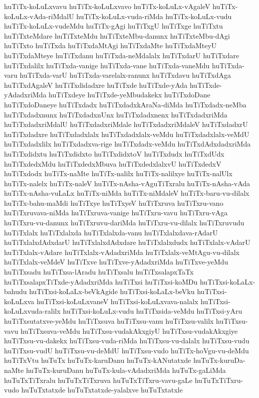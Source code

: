 {huTiTx-koLuLxvavu
huTiTx-koLuLxvavo
huTiTx-koLuLx-vAgaleV
huTiTx-koLuLx-vAda-riMdalU
huTiTx-koLuLx-vuda-riMda
huTiTx-koLuLx-vudu
huTiTx-koLuLx-vudeMdu
huTiTx-gAgi
huTiTxgU
huTiTxge
huTiTxtu
huTiTxteMdare
huTiTxteMdu
huTiTxteMbu-danunx
huTiTxteMbu-dAgi
huTiTxto
huTiTxda
huTiTxdaMtAgi
huTiTxdaMte
huTiTxdaMteyU
huTiTxdaMteye
huTiTxdanu
huTiTxda-neMdalalx
huTiTxdarU
huTiTxdare
huTiTxdalilx
huTiTxda-vanige
huTiTxda-vane
huTiTxda-vaneMdu
huTiTxda-varu
huTiTxda-varU
huTiTxda-varelalx-ranunx
huTiTxdavu
huTiTxdAga
huTiTxdAgaleV
huTiTxdidadxre
huTiTxde
huTiTxde-yAda
huTiTxde-yAdadxriMda
huTiTxdeye
huTiTxde-yeMbudakekx
huTiTxdoDane
huTiTxdoDaneye
huTiTxdadx
huTiTxdadxkAraNa-diMda
huTiTxdadx-neMba
huTiTxdadxnunx
huTiTxdadxnUnx
huTiTxdadxnenx
huTiTxdadxriMda
huTiTxdadxriMdalU
huTiTxdadxriMdale
huTiTxdadxriMdaleV
huTiTxdadxrU
huTiTxdadxre
huTiTxdadxlalx
huTiTxdadxlalx-veMdu
huTiTxdadxlalx-veMdU
huTiTxdadxlilx
huTiTxdadxva-rige
huTiTxdadx-veMdu
huTiTxdAdxdadxriMda
huTiTxdidxtu
huTiTxdidxto
huTiTxdidxtoV
huTiTxdudx
huTiTxdUdx
huTiTxdedxMdu
huTiTxdedxMbuva
huTiTxdedxlalxvU
huTiTxdedxV
huTiTxdodx
huTiTx-naMte
huTiTx-nalilx
huTiTx-nalilxye
huTiTx-nalUlx
huTiTx-nalelx
huTiTx-naleV
huTiTx-nAsha-vAguTiTxralu
huTiTx-nAsha-vAda
huTiTx-nAsha-vuLaLx
huTiTx-niMda
huTiTx-niMdaleV
huTiTx-baru-vu-dilalx
huTiTx-bahu-maMdi
huTiTxye
huTiTxyeV
huTiTxruva
huTiTxru-vano
huTiTxruvava-niMda
huTiTxruva-vanige
huTiTxru-vavu
huTiTxru-vAga
huTiTxru-vu-danunx
huTiTxruvu-dariMda
huTiTxru-vu-dilalx
huTiTxruvudu
huTiTxlalx
huTiTxlalxda
huTiTxlalxda-vanu
huTiTxlalxdava-rAdarU
huTiTxlalxdAdxdarU
huTiTxlalxdAdxdare
huTiTxlalxdudx
huTiTxlalx-vAdarU
huTiTxlalx-vAdare
huTiTxlalx-vAdadxriMda
huTiTxlalx-veMtAgu-vu-dilalx
huTiTxlalx-veMdeV
huTiTxve
huTiTxve-yAdadxriMda
huTiTxve-yeMdu
huTiTxsadu
huTiTxsa-lAradu
huTiTxsalu
huTiTxsalapxTaTx
huTiTxsalapxTiTxde-yAdadxriMda
huTiTxsi
huTiTxsi-koMDu
huTiTxsi-koLaLx-bahudu
huTiTxsi-koLaLx-beVkAgide
huTiTxsi-koLaLx-beVku
huTiTxsi-koLuLxva
huTiTxsi-koLuLxvaneV
huTiTxsi-koLuLxvava-nalalx
huTiTxsi-koLuLxvuda-ralilx
huTiTxsi-koLuLx-vudu
huTiTxsida-veMdu
huTiTxsi-yAru
huTiTxsutatxve-yeMdu
huTiTxsuva
huTiTxsu-vanu
huTiTxsu-valilx
huTiTxsu-vavu
huTiTxsuva-veMdu
huTiTxsu-vudakAkxgiyU
huTiTxsu-vudakAkxgiye
huTiTxsu-vu-dakekx
huTiTxsu-vuda-riMda
huTiTxsu-vu-dalalx
huTiTxsu-vudu
huTiTxsu-vudU
huTiTxsu-vu-deMdU
huTiTxsu-vudo
huTiTx-hoVgu-vu-deMdu
huTiTxVtu
huTuTx
huTuTx-karuDanu
huTuTx-kANutatxde
huTuTx-kuruDa-naMte
huTuTx-kuruDanu
huTuTx-kula-vAdadxriMda
huTuTx-gaLiMda
huTuTxTiTxralu
huTuTxTiTxruva
huTuTxTiTxru-vavu-gaLe
huTuTxTiTxru-vudo
huTuTxtatxde
huTuTxtatxde-yalalxve
huTuTxtatxle
}
